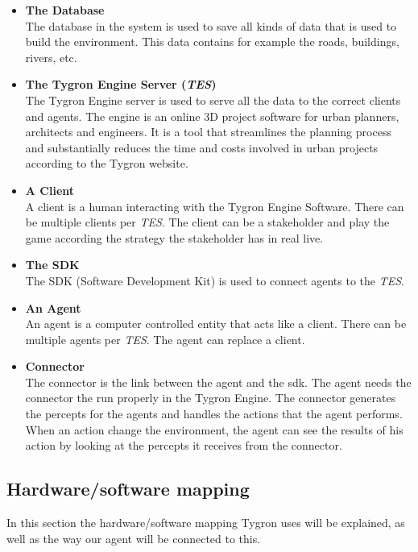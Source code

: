 \begin{itemize}
	\item \textbf{The Database} \\ 
	The database in the system is used to save all kinds of data that is used to build the environment. This data contains for example the roads, buildings, rivers, etc.
	\item \textbf{The Tygron Engine Server (\textit{TES})} \\ 
	The Tygron Engine server is used to serve all the data to the correct clients and agents. The engine is an online 3D project software for urban planners, architects and engineers. It is a tool that streamlines the planning process and substantially reduces the time and costs involved in urban projects according to the Tygron website.
	\item \textbf{A Client} \\
	A client is a human interacting with the Tygron Engine Software. There can be multiple clients per \textit{TES}. The client can be a stakeholder and play the game according the strategy the stakeholder has in real live. 
	\item \textbf{The SDK} \\
	The SDK (Software Development Kit) is used to connect agents to the \textit{TES}.
	\item \textbf{An Agent} \\
	An agent is a computer controlled entity that acts like a client. There can be multiple agents per \textit{TES}. The agent can replace a client.
	\item \textbf{Connector} \\
	The connector is the link between the agent and the sdk. The agent needs the connector the run properly in the Tygron Engine. The connector generates the percepts for the agents and handles the actions that the agent performs. When an action change the environment, the agent can see the results of his action by looking at the percepts it receives from the connector.
\end{itemize}

\newpage
\subsection{Hardware/software mapping}
In this section the hardware/software mapping Tygron uses will be explained, as well as the way our agent will be connected to this.

